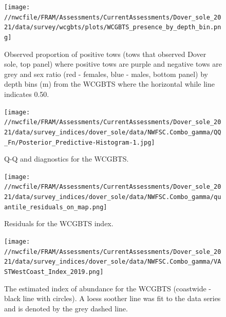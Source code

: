 \documentclass[11pt,
  english,
  a4paper,
]{article}
\begin{document}
\begin{figure}
\centering
\texttt{[image: //nwcfile/FRAM/Assessments/CurrentAssessments/Dover\_sole\_2021/data/survey/wcgbts/plots/WCGBTS\_presence\_by\_depth\_bin.png]}
\caption{Observed proportion of positive tows (tows that observed Dover sole, top panel) where positive tows are purple and negative tows are grey and sex ratio (red - females, blue - males, bottom panel) by depth bins (m) from the WCGBTS where the horizontal while line indicates 0.50.\label{fig:pos-tows-sex-ratio}}
\end{figure}

\tagmcend\tagstructend

\newpage


\begin{figure}
\centering
\texttt{[image: //nwcfile/FRAM/Assessments/CurrentAssessments/Dover\_sole\_2021/data/survey\_indices/dover\_sole/data/NWFSC.Combo\_gamma/QQ\_Fn/Posterior\_Predictive-Histogram-1.jpg]}
\caption{Q-Q and diagnostics for the WCGBTS.\label{fig:wcgbt-qq}}
\end{figure}

\tagmcend\tagstructend

\newpage


\begin{figure}
\centering
\texttt{[image: //nwcfile/FRAM/Assessments/CurrentAssessments/Dover\_sole\_2021/data/survey\_indices/dover\_sole/data/NWFSC.Combo\_gamma/quantile\_residuals\_on\_map.png]}
\caption{Residuals for the WCGBTS index.\label{fig:wcgbt-resid}}
\end{figure}

\tagmcend\tagstructend

\newpage


\begin{figure}
\centering
\texttt{[image: //nwcfile/FRAM/Assessments/CurrentAssessments/Dover\_sole\_2021/data/survey\_indices/dover\_sole/data/NWFSC.Combo\_gamma/VASTWestCoast\_Index\_2019.png]}
\caption{The estimated index of abundance for the WCGBTS (coastwide - black line with circles). A loess soother line was fit to the data series and is denoted by the grey dashed line.\label{fig:wcgbt-index}}
\end{figure}
\end{document}
